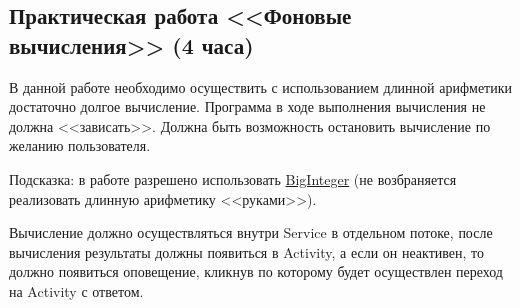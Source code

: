 \subsection{Практическая работа <<Фоновые вычисления>> (4 часа)}

В данной работе необходимо осуществить с использованием длинной арифметики достаточно долгое вычисление. 
Программа в ходе выполнения вычисления не должна <<зависать>>. 
Должна быть возможность остановить вычисление по желанию пользователя. 

Подсказка: в работе разрешено использовать \href{https://developer.android.com/reference/java/math/BigInteger}{BigInteger} (не возбраняется реализовать длинную арифметику <<руками>>).

Вычисление должно осуществляться внутри Service в отдельном потоке, после вычисления результаты должны появиться в Activity, а если он неактивен, то должно
появиться оповещение, кликнув по которому будет осуществлен переход на Activity с ответом.

